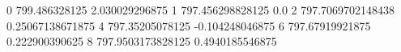 0 799.486328125 2.030029296875
1 797.456298828125 0.0
2 797.7069702148438 0.25067138671875
4 797.35205078125 -0.104248046875
6 797.67919921875 0.222900390625
8 797.9503173828125 0.4940185546875
